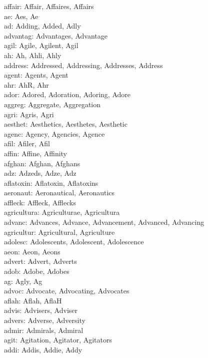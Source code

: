 


\noindent
affair: Affair, Affaires, Affairs\\
ae: Aes, Ae\\
ad: Adding, Added, Adly\\
advantag: Advantages, Advantage\\
agil: Agile, Agilent, Agil\\
ah: Ah, Ahli, Ahly\\
address: Addressed, Addressing, Addresses, Address\\
agent: Agents, Agent\\
ahr: AhR, Ahr\\
ador: Adored, Adoration, Adoring, Adore\\
aggreg: Aggregate, Aggregation\\
agri: Agris, Agri\\
aesthet: Aesthetics, Aesthetes, Aesthetic\\
agenc: Agency, Agencies, Agence\\
afil: Afiler, Afil\\
affin: Affine, Affinity\\
afghan: Afghan, Afghans\\
adz: Adzeds, Adze, Adz\\
aflatoxin: Aflatoxin, Aflatoxins\\
aeronaut: Aeronautical, Aeronautics\\
affleck: Affleck, Afflecks\\
agricultura: Agriculturae, Agricultura\\
advanc: Advances, Advance, Advancement, Advanced, Advancing\\
agricultur: Agricultural, Agriculture\\
adolesc: Adolescents, Adolescent, Adolescence\\
aeon: Aeon, Aeons\\
advert: Advert, Adverts\\
adob: Adobe, Adobes\\
ag: Agly, Ag\\
advoc: Advocate, Advocating, Advocates\\
aflah: Aflah, AflaH\\
advis: Advisers, Adviser\\
advers: Adverse, Adversity\\
admir: Admirals, Admiral\\
agit: Agitation, Agitator, Agitators\\
addi: Addis, Addie, Addy\\
